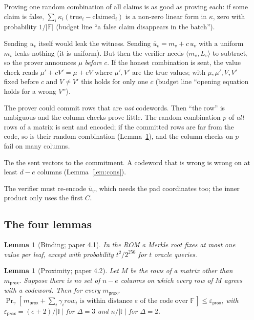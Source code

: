 \documentclass[11pt,a4paper]{article}
\newcommand{\F}{\mathbb{F}}
\newcommand{\ip}[2]{\langle #1, #2\rangle}
\newcommand{\epsprox}{\varepsilon_{\mathsf{prox}}}
\theoremstyle{definition}
\theoremstyle{plain}
\newtheorem{lemma}[definition]{Lemma}
\begin{document}
\begin{description}[leftmargin=1em,itemsep=2pt]
\item[$\kappa$ (batching).] Proving one random combination of all claims is as good as proving each:
  if some claim is false, $\sum_i\kappa_i(\text{true}_i-\text{claimed}_i)$ is a non-zero linear form in
  $\kappa$, zero with probability $1/|\F|$ (budget line ``a false claim disappears in the batch'').
\item[$\mu$ and $c$.] Sending $u_v$ itself would leak the witness. Sending $\bar u_v=m_v+c\,u_v$ with a
  uniform $m_v$ leaks nothing (it is uniform). But then the verifier needs $\ip{m_v}{L_v}$ to subtract, so the
  prover announces $\mu$ \emph{before} $c$. If the honest combination is sent, the value check reads
  $\mu'+cV'=\mu+cV$ where $\mu',V'$ are the true values; with $\mu,\mu',V,V'$ fixed before $c$ and $V\neq V'$
  this holds for only one $c$ (budget line ``opening equation holds for a wrong $V$'').
\item[$\gamma$ and $p$ (proximity test).] The prover could commit rows that are \emph{not} codewords.
  Then ``the row'' is ambiguous and the column checks prove little. The random combination $p$ of
  \emph{all} rows of a matrix is sent and encoded; if the committed rows are far from the code, so is
  their random combination (Lemma~\ref{lem:prox}), and the column checks on $p$ fail on many columns.
\item[Column queries.] Tie the sent vectors to the commitment. A codeword that is wrong is wrong on at
  least $d-e$ columns (Lemma~\ref{lem:cons}).
\item[All $k$ coordinates of $\bar u_v$.] The verifier must re-encode $\bar u_v$, which needs the pad
  coordinates too; the inner product only uses the first $C$.
\end{description}

\subsection{The four lemmas}
\label{sec:opening-lemmas}

\begin{lemma}[Binding; paper 4.1]
In the ROM a Merkle root fixes at most one value per leaf, except with probability $t^2/2^{256}$ for $t$
oracle queries.
\end{lemma}

\begin{lemma}[Proximity; paper 4.2]\label{lem:prox}
Let $M$ be the rows of a matrix other than $m_{\mathsf{prox}}$. Suppose there is no set of $n-e$ columns
on which every row of $M$ agrees with a codeword. Then for every $m_{\mathsf{prox}}$,
$\Pr_\gamma[\,m_{\mathsf{prox}}+\sum_i\gamma_i\mathit{row}_i\text{ is within distance }e\text{ of the code over }\F\,]\le\epsprox$,
with $\epsprox=(e+2)/|\F|$ for $\Delta=3$ and $n/|\F|$ for $\Delta=2$.
\end{lemma}
\end{document}
